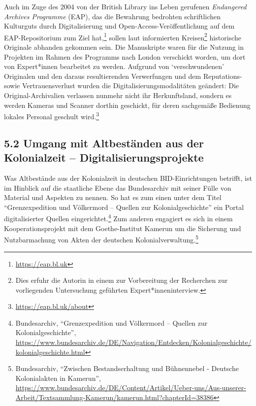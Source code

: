 \documentclass[a4paper,
fontsize=11pt,
oneside,
numbers=noperiodatend,
parskip=half-,
bibliography=totoc,
final
]{scrartcl}
\begin{document}
Auch im Zuge des 2004 von der British Library ins Leben gerufenen
\emph{Endangered Archives Programme} (EAP), das die Bewahrung bedrohten
schriftlichen Kulturguts durch Digitalisierung und
Open-Access-Veröffentlichung auf dem EAP-Repositorium zum Ziel
hat,\footnote{\url{https://eap.bl.uk}} sollen laut informierten
Kreisen\footnote{Dies erfuhr die Autorin in einem zur Vorbereitung der
  Recherchen zur vorliegenden Untersuchung geführten
  Expert*inneninterview.} historische Originale abhanden gekommen sein.
Die Manuskripte waren für die Nutzung in Projekten im Rahmen des
Programms nach London verschickt worden, um dort von Expert*innen
bearbeitet zu werden. Aufgrund von \enquote*{verschwundenen} Originalen
und den daraus resultierenden Verwerfungen und dem Reputations- sowie
Vertrauensverlust wurden die Digitalisierungsmodalitäten geändert: Die
Original-Archivalien verlassen nunmehr nicht ihr Herkunftsland, sondern
es werden Kameras und Scanner dorthin geschickt, für deren sachgemäße
Bedienung lokales Personal geschult wird.\footnote{\url{https://eap.bl.uk/about}}

\hypertarget{umgang-mit-altbestuxe4nden-aus-der-kolonialzeit-digitalisierungsprojekte}{%
\subsection{5.2 Umgang mit Altbeständen aus der Kolonialzeit --
Digitalisierungsprojekte}\label{umgang-mit-altbestuxe4nden-aus-der-kolonialzeit-digitalisierungsprojekte}}

Was Altbestände aus der Kolonialzeit in deutschen BID-Einrichtungen
betrifft, ist im Hinblick auf die staatliche Ebene das Bundesarchiv mit
seiner Fülle von Material und Aspekten zu nennen. So hat es zum einen
unter dem Titel \enquote{Grenzexpedition und Völkermord -- Quellen zur
Kolonialgeschichte} ein Portal digitalisierter Quellen
eingerichtet.\footnote{Bundesarchiv, \enquote{Grenzexpedition und
  Völkermord -- Quellen zur Kolonialgeschichte},
  \url{https://www.bundesarchiv.de/DE/Navigation/Entdecken/Kolonialgeschichte/kolonialgeschichte.html}}
Zum anderen engagiert es sich in einem Kooperationsprojekt mit dem
Goethe-Institut Kamerun um die Sicherung und Nutzbarmachung von Akten
der deutschen Kolonialverwaltung.\footnote{Bundesarchiv,
  \enquote{Zwischen Bestandserhaltung und Bühnennebel - Deutsche
  Kolonialakten in Kamerun},
  \url{https://www.bundesarchiv.de/DE/Content/Artikel/Ueber-uns/Aus-unserer-Arbeit/Textsammlung-Kamerun/kamerun.html?chapterId=38386}}
\end{document}
